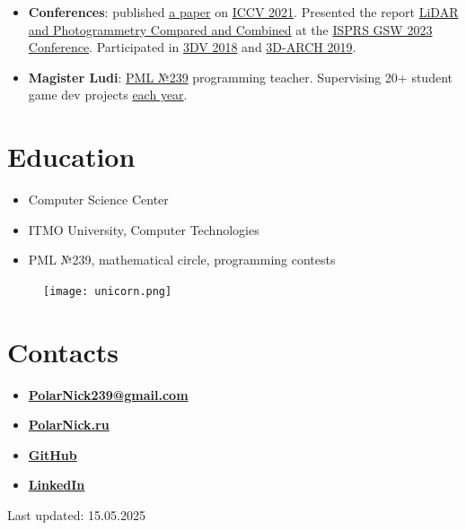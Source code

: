 \documentclass[11pt,oneside]{article}
\newcommand{\hhref}[2]{\href{#1}{\color{blue}#2}}
\begin{document}
\begin{itemize}
    \item{\textbf{Conferences}}: published \hhref{https://www.polarnick.com/static/papers/poliarnyi2021.pdf}{a paper} on \hhref{http://iccv2021.thecvf.com/}{ICCV 2021}. Presented the report \hhref{https://polarnick.com/static/presentations/AgisoftMetashapeGSW2023.pdf}{LiDAR and Photogrammetry Compared and Combined} at the \hhref{https://gsw2023.com/}{ISPRS GSW 2023 Conference}. Participated in \hhref{http://3dv18.uniud.it/}{3DV 2018} and \hhref{http://www.3d-arch.org/}{3D-ARCH 2019}.

    \item{\textbf{Magister Ludi}}: \hhref{http://239.ru}{PML №239} programming teacher. Supervising 20+ student game dev projects \hhref{https://www.youtube.com/watch?v=bbKXnsysUXw}{each year}.
\end{itemize}

\vspace{-9pt}
\section*{\textbf{Education}}
\vspace{-9pt}

\begin{itemize}
    \item{Computer Science Center}
    \item{ITMO University, Computer Technologies}
    \item{PML №239, mathematical circle, programming contests}
\end{itemize}

\begin{figure}
    \centering
    \texttt{[image: unicorn.png]}
\end{figure}

\vspace{-9pt}
\section*{\textbf{Contacts}}
\vspace{-9pt}

\begin{itemize}

    \item{\textbf{\hhref{mailto:PolarNick239@gmail.com}{PolarNick239@gmail.com}}}

    \item{\textbf{\hhref{http://polarnick239.github.io/index_ru.html}{PolarNick.ru}}}

    \item{\textbf{\hhref{https://github.com/PolarNick239}{GitHub}}}

    \item{\textbf{\hhref{https://www.linkedin.com/in/nikolai-poliarnyi-61393b7b}{LinkedIn}}}

\end{itemize}

Last updated: 15.05.2025
\end{document}
